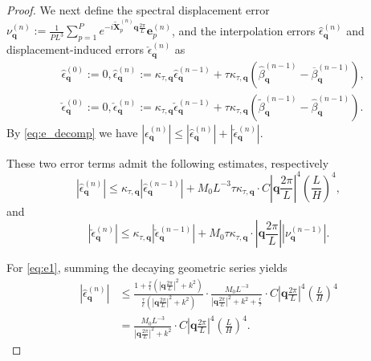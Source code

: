 \documentclass[review,onefignum,onetabnum]{siamart250211}
\begin{document}
\begin{proof}
We next define the spectral displacement error 
\(\nu_{\mathbf{q}}^{(n)} := \frac{1}{P L^3}\sum_{p=1}^P e^{-i\widetilde{\mathbf{X}}_p^{(n)}\mathbf{q}\frac{2\pi}{L}} \mathbf{e}_p^{(n)}\), and the interpolation errors $\hat{\epsilon}_{\mathbf{q}}^{(n)}$ and displacement-induced errors $\check{\epsilon}_{\mathbf{q}}^{(n)}$ as
\begin{equation}
\begin{aligned}
&\hat{\epsilon}_{\mathbf{q}}^{(0)}:=0,\hat{\epsilon}_{\mathbf{q}}^{(n)}:=\kappa_{\tau,\mathbf q}\hat{\epsilon}^{(n-1)}_{\mathbf{q}}+ \tau \kappa_{\tau,\mathbf q}
  ( \hat{\beta}^{(n-1)}_{\mathbf{q}} - \overline{\beta}^{(n-1)}_{\mathbf{q}} ),\\
&\check{\epsilon}_{\mathbf{q}}^{(0)}:=0,\check{\epsilon}_{\mathbf{q}}^{(n)}:=\kappa_{\tau,\mathbf q} \check{\epsilon}^{(n-1)}_{\mathbf{q}}+ \tau \kappa_{\tau,\mathbf q}
  ( \tilde{\beta}^{(n-1)}_{\mathbf{q}} - \hat{\beta}^{(n-1)}_{\mathbf{q}} ).
\end{aligned}
\end{equation}
By \eqref{eq:e_decomp} we have $|\epsilon_{\mathbf{q}}^{(n)}| \leq |\hat{\epsilon}_{\mathbf{q}}^{(n)}| + |\check{\epsilon}_{\mathbf{q}}^{(n)}|.$

These two error terms admit the following estimates, respectively
\begin{equation}
\label{eq:e1}
|\hat{\epsilon}_{\mathbf{q}}^{(n)}| \leq \kappa_{\tau,\mathbf q} |\hat{\epsilon}_{\mathbf{q}}^{(n-1)}| 
+ M_0 L^{-3} \tau \kappa_{\tau,\mathbf q} \cdot  C \left|\mathbf{q}\frac{2\pi}{L}\right|^4 \left( \frac{L}{H} \right)^4,
\end{equation}
and
\begin{equation}
\label{eq:e2}
|\check{\epsilon}_{\mathbf{q}}^{(n)}| \leq \kappa_{\tau,\mathbf q}|\check{\epsilon}_{\mathbf{q}}^{(n-1)}| 
+ M_0 \tau \kappa_{\tau,\mathbf q} \cdot  \left|\mathbf{q}\frac{2\pi}{L}\right|\left| \nu_{\mathbf{q}}^{(n-1)} \right|.
\end{equation}

For \eqref{eq:e1}, summing the decaying geometric series yields
\begin{equation}
\label{eq:sum_decay}
\begin{aligned}
|\hat{\epsilon}_{\mathbf{q}}^{(n)}| 
&\leq \frac{1 + \frac{\tau}{\epsilon}\left(|\mathbf{q}\frac{2\pi}{L}|^2 + k^2\right)}{\frac{\tau}{\epsilon}\left(|\mathbf{q}\frac{2\pi}{L}|^2 + k^2\right)} 
\cdot \frac{M_0 L^{-3}}{|\mathbf{q}\frac{2\pi}{L}|^2 + k^2 + \frac{\epsilon}{\tau}} 
\cdot  C \left|\mathbf{q}\frac{2\pi}{L}\right|^4 \left( \frac{L}{H} \right)^4 \\
&= \frac{M_0 L^{-3}}{|\mathbf{q}\frac{2\pi}{L}|^2 + k^2} 
\cdot  C \left|\mathbf{q}\frac{2\pi}{L}\right|^4 \left( \frac{L}{H} \right)^4.
\end{aligned}
\end{equation}


\end{proof}
\end{document}
